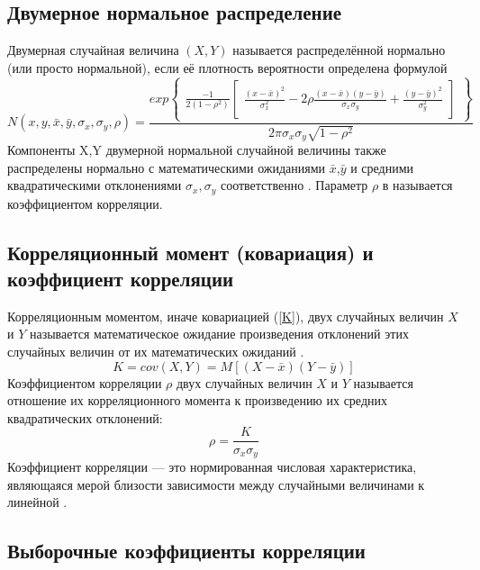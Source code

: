 \documentclass[../body.tex]{subfiles}
\begin{document}
	\subsection{Двумерное нормальное распределение}
	Двумерная случайная величина $(X,Y)$ называется распределённой нормально (или просто нормальной), если её плотность вероятности определена формулой
	\begin{equation}
		N(x, y, \bar{x}, \bar{y}, \sigma_{x}, \sigma_{y}, \rho) = 
		\frac{	exp{\begin{Bmatrix}
				\frac{-1}{2(1-\rho^{2})}
				\begin{bmatrix}
				\frac{(x-\bar{x})^{2}}{\sigma_{x}^{2}} - 2\rho\frac{(x-\bar{x})(y-\bar{y})}{\sigma_{x}\sigma_{y}} + \frac{(y-\bar{y})^{2}}{\sigma_{y}^{2}}
				\end{bmatrix}
				\end{Bmatrix}} }{2\pi\sigma_{x}\sigma_{y}\sqrt{1-\rho^{2}}}
		\label{N}	
	\end{equation}
	Компоненты X,Y двумерной нормальной случайной величины также распределены нормально с математическими ожиданиями $\bar{x}$,$\bar{y}$ и средними квадратическими отклонениями $\sigma_{x},\sigma_{y}$ соответственно \cite[c.~133-134]{max}.
	Параметр $\rho$ в  называется коэффициентом корреляции.
	
	
	
	\subsection{Корреляционный момент (ковариация) и коэффициент корреляции}
	Корреляционным моментом, иначе ковариацией (\ref{K}), двух случайных величин $X$ и $Y$ называется математическое ожидание произведения отклонений этих случайных величин от их математических ожиданий \cite[c.~141]{max}.
	\begin{equation}
		K = cov(X, Y) = M[(X - \bar{x})(Y - \bar{y})]
		\label{K}
	\end{equation}
	Коэффициентом корреляции $\rho$ двух случайных величин $X$ и $Y$ называется отношение их корреляционного момента к произведению их средних квадратических отклонений:
	\begin{equation}
		\rho = \frac{K}{\sigma_{x}\sigma_{y}}
		\label{rho}
	\end{equation}
	Коэффициент корреляции — это нормированная числовая характеристика, являющаяся мерой близости зависимости между случайными величинами к линейной \cite[c.~150]{max}.
	
	\subsection{Выборочные коэффициенты корреляции}
\end{document}
